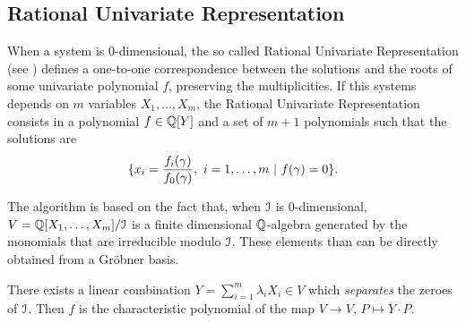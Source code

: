 \subsection{Rational Univariate Representation}\label{sec:rur}

When a system is 0-dimensional, the so called Rational Univariate Representation (see
\cite{Rouillier1999}) defines a one-to-one correspondence between the solutions and the roots
of some univariate polynomial $f$, preserving the multiplicities.
If this systems depends on $m$ variables $X_1, \ldots ,X_m$,
the Rational Univariate Representation consists in a polynomial $f \in \mathbb{Q}[Y]$ and a set of
$m+1$ polynomials such that the solutions are
$$\{ x_i = \Frac{f_{i}(\gamma)}{f_0(\gamma)},\ i= 1, \ldots, m \ |\  f(\gamma)=0\}.$$

The algorithm is based on the fact that, when $\mathcal I$ is 0-dimensional,
$V=\mathbb{Q}[X_1,\ldots,X_m]/\mathcal I$ is a finite dimensional $\mathbb{Q}$-algebra %
generated by the monomials that are irreducible modulo $\mathcal I$. 
These elements than can be directly obtained
from a Gröbner basis. %

There exists a linear combination $Y = \sum_{i=1}^m \lambda_i X_i \in V$ 
which {\em separates} the zeroes of $\mathcal I$.   
Then $f$ is the characteristic polynomial of the map $V\rightarrow V$, $P \mapsto Y \cdot P$.

